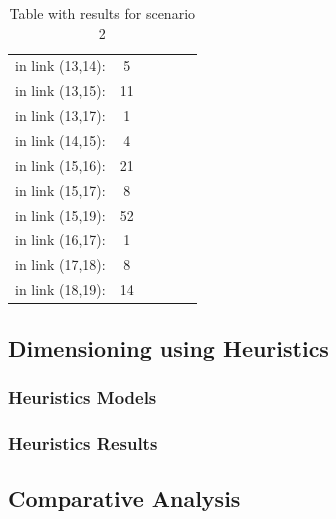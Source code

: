 \begin{table}[h!]
\begin{tabular}{|| c | c || c | c || c | c ||}
in link (13,14): & 5& & & & \\
in link (13,15): & 11& & & & \\
in link (13,17): & 1& & & & \\
in link (14,15): & 4& & & & \\
in link (15,16): & 21& & & & \\
in link (15,17): & 8& & & & \\
in link (15,19): & 52& & & & \\
in link (16,17): & 1& & & & \\
in link (17,18): & 8& & & & \\
in link (18,19): & 14& & & & \\
 \hline
\end{tabular}
\caption{Table with results for scenario 2}
\label{result_ILP4_TP}
\end{table}

\newpage

\subsection{Dimensioning using Heuristics}

\subsubsection{Heuristics Models}

\subsubsection{Heuristics Results}

\subsection{Comparative Analysis} 